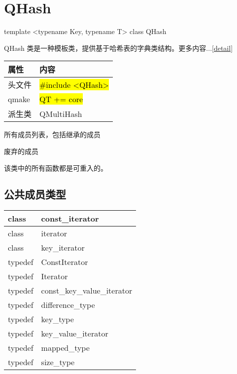 \chapter{QHash}\label{hash}

template <typename Key, typename T> class QHash

QHash 类是一种模板类，提供基于哈希表的字典类结构。更多内容...\ref{detail}


\begin{tabular}{|l|l|}
\hline
属性& 	内容\\
\hline
头文件& 	\hl{\#include <QHash>}\\
\hline
qmake& 	\hl{QT += core}\\
\hline
派生类& 	QMultiHash\\
\hline
\end{tabular}


\begin{compactitem}[\arr]
\item 所有成员列表，包括继承的成员
\item 废弃的成员
\end{compactitem}

\begin{notice}
该类中的所有函数都是可重入的。
\end{notice}

\splitLine

\section{公共成员类型}

\begin{tabular}{|m{5em}|m{30em}|}
\hline
class& 	const\_iterator\\
\hline
class& 	iterator\\
\hline
class& 	key\_iterator\\
\hline
typedef& 	ConstIterator\\
\hline
typedef& 	Iterator\\
\hline
typedef& 	const\_key\_value\_iterator\\
\hline
typedef& 	difference\_type\\
\hline
typedef& 	key\_type\\
\hline
typedef& 	key\_value\_iterator\\
\hline
typedef& 	mapped\_type\\
\hline
typedef& 	size\_type\\
\hline
\end{tabular}


